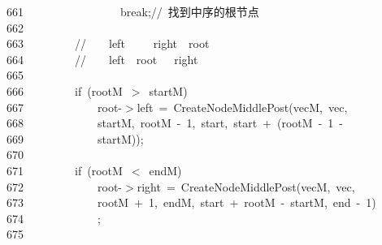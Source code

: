 \documentclass[11pt,a4paper]{ctexart}
\newcommand{\hlstd}[1]{\textcolor[rgb]{0.2,0.2,0.2}{#1}}
\newcommand{\hlnum}[1]{\textcolor[rgb]{0.06,0.58,0.63}{#1}}
\newcommand{\hlslc}[1]{\textcolor[rgb]{0.59,0.59,0.59}{#1}}
\newcommand{\hlopt}[1]{\textcolor[rgb]{0.2,0.2,0.2}{#1}}
\newcommand{\hllin}[1]{\textcolor[rgb]{0.59,0.59,0.59}{#1}}
\newcommand{\hlkwa}[1]{\textcolor[rgb]{0.23,0.42,0.78}{#1}}
\newcommand{\hlkwd}[1]{\textcolor[rgb]{0.78,0.23,0.41}{#1}}
\begin{document}
\hllin{661\ }\hlstd{}\hlstd{\ \ \ \ \ \ \ \ \ \ \ \ \ \ \ \ }\hlstd{}\hlkwa{break}\hlstd{}\hlopt{;}\hlstd{}\hlslc{//\ 找到中序的根节点}\\
\hllin{662\ }\hlstd{}\\
\hllin{663\ }\hlstd{}\hlstd{\ \ \ \ \ \ \ \ }\hlstd{}\hlslc{//\ \textbar }\hlstd{\ \ \ }\hlslc{left}\hlstd{\ \ }\hlslc{\textbar }\hlstd{\ \ \ }\hlslc{right}\hlstd{\ \ }\hlslc{\textbar root\textbar }\\
\hllin{664\ }\hlstd{}\hlstd{\ \ \ \ \ \ \ \ }\hlstd{}\hlslc{//\ \textbar }\hlstd{\ \ \ }\hlslc{left}\hlstd{\ \ }\hlslc{\textbar root\textbar }\hlstd{\ \ \ }\hlslc{right}\hlstd{\ \ }\hlslc{\textbar }\\
\hllin{665\ }\hlstd{}\\
\hllin{666\ }\hlstd{}\hlstd{\ \ \ \ \ \ \ \ }\hlstd{}\hlkwa{if\ }\hlstd{}\hlopt{(}\hlstd{rootM\ }\hlopt{$>$\ }\hlstd{startM}\hlopt{)}\\
\hllin{667\ }\hlstd{}\hlstd{\ \ \ \ \ \ \ \ \ \ \ \ }\hlstd{root}\hlopt{{-}$>$}\hlstd{left\ }\hlopt{=\ }\hlstd{}\hlkwd{CreateNodeMiddlePost}\hlstd{}\hlopt{(}\hlstd{vecM}\hlopt{,\ }\hlstd{vec}\hlopt{,\ }\Righttorque\\
\hllin{668\ }\hlstd{}\hlstd{\ \ \ \ \ \ \ \ \ \ \ \ }\hlstd{startM}\hlopt{,\ }\hlstd{rootM\ }\hlopt{{-}\ }\hlstd{}\hlnum{1}\hlstd{}\hlopt{,\ }\hlstd{start}\hlopt{,\ }\hlstd{start\ }\hlopt{+\ (}\hlstd{rootM\ }\hlopt{{-}\ }\hlstd{}\hlnum{1\ }\hlstd{}\hlopt{{-}\ }\Righttorque\\
\hllin{669\ }\hlstd{}\hlstd{\ \ \ \ \ \ \ \ \ \ \ \ }\hlstd{startM}\hlopt{));}\\
\hllin{670\ }\hlstd{}\\
\hllin{671\ }\hlstd{}\hlstd{\ \ \ \ \ \ \ \ }\hlstd{}\hlkwa{if\ }\hlstd{}\hlopt{(}\hlstd{rootM\ }\hlopt{$<$\ }\hlstd{endM}\hlopt{)}\\
\hllin{672\ }\hlstd{}\hlstd{\ \ \ \ \ \ \ \ \ \ \ \ }\hlstd{root}\hlopt{{-}$>$}\hlstd{right\ }\hlopt{=\ }\hlstd{}\hlkwd{CreateNodeMiddlePost}\hlstd{}\hlopt{(}\hlstd{vecM}\hlopt{,\ }\hlstd{vec}\hlopt{,\ }\Righttorque\\
\hllin{673\ }\hlstd{}\hlstd{\ \ \ \ \ \ \ \ \ \ \ \ }\hlstd{rootM\ }\hlopt{+\ }\hlstd{}\hlnum{1}\hlstd{}\hlopt{,\ }\hlstd{endM}\hlopt{,\ }\hlstd{start\ }\hlopt{+\ }\hlstd{rootM\ }\hlopt{{-}\ }\hlstd{startM}\hlopt{,\ }\hlstd{end\ }\hlopt{{-}\ }\hlstd{}\hlnum{1}\hlstd{}\hlopt{)}\Righttorque\\
\hllin{674\ }\hlstd{}\hlstd{\ \ \ \ \ \ \ \ \ \ \ \ }\hlstd{}\hlopt{;}\\
\hllin{675\ }\hlstd{}\\
\end{document}
